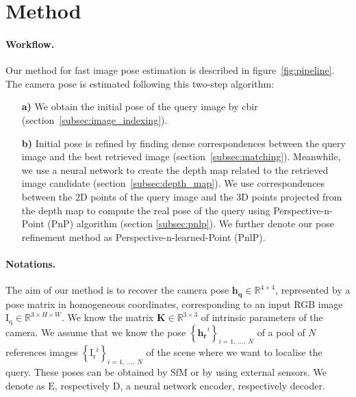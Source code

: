 \section{Method}
\label{sec:method}




\paragraph{Workflow.}
Our method for fast image pose estimation is described in figure~\ref{fig:pipeline}. The camera pose is estimated following this two-step algorithm:
\begin{itemize}
	\item[\textbf{a)}] We obtain the initial pose of the query image by \ac{cbir} (section~\ref{subsec:image_indexing}).
	\item[\textbf{b)}] Initial pose is refined by finding dense correspondences between the query image and the best retrieved image (section~\ref{subsec:matching}). Meanwhile, we use a neural network to create the depth map related to the retrieved image candidate (section~\ref{subsec:depth_map}). We use correspondences between the 2D points of the query image and the 3D points projected from the depth map to compute the real pose of the query using Perspective-n-Point (PnP) algorithm (section \ref{subsec:pnlp}). We further denote our pose refinement method as Perspective-n-learned-Point (PnlP).
\end{itemize}


\paragraph{Notations.}
The aim of our method is to recover the camera pose $\mathbf{h_q}\in\mathbb{R}^{4\times 4}$, represented by a pose matrix in homogeneous coordinates, corresponding to an input RGB image $\mathrm{I_q}\in\mathbb{R}^{3\times H\times W}$. We know the matrix $\mathbf{K}\in\mathbb{R}^{3\times 3}$ of intrinsic parameters of the camera. We assume that we know the pose $\left\{ \mathbf{h_r}^{i} \right\}_{i=1,\ \ldots ,\ N}$ of a pool of $N$ references images $\left\{ \mathrm{I_{r}}^{i} \right\}_{i=1,\ \ldots ,\ N}$ of the scene where we want to localise the query. These poses can be obtained by SfM or by using external sensors. We denote as $\mathrm{E}$, respectively $\mathrm{D}$, a neural network encoder, respectively decoder.

